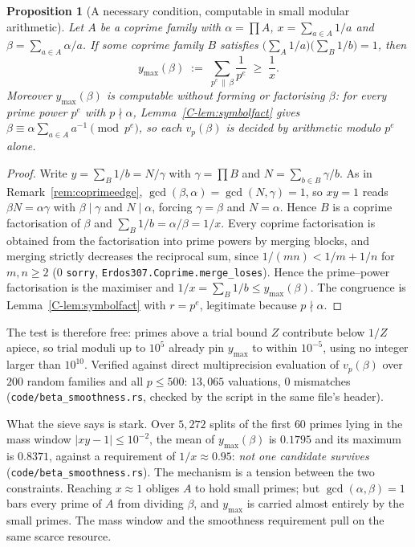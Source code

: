 \documentclass[11pt]{article}
\newtheorem{proposition}[theorem]{Proposition}
\theoremstyle{definition}
\begin{document}
\begin{proposition}[A necessary condition, computable in small modular arithmetic]\label{prop:coprimesieve}
Let $A$ be a coprime family with $\alpha=\prod A$, $x=\sum_{a\in A}1/a$ and
$\beta=\sum_{a\in A}\alpha/a$. If some coprime family $B$ satisfies $\bigl(\sum_A1/a\bigr)
\bigl(\sum_B1/b\bigr)=1$, then
\[ y_{\max}(\beta)\;:=\;\sum_{p^e\,\|\,\beta}\frac1{p^e}\;\ge\;\frac1x .\]
Moreover $y_{\max}(\beta)$ is computable without forming or factorising $\beta$: for every prime
power $p^e$ with $p\nmid\alpha$, Lemma~\ref{C-lem:symbolfact} gives
$\beta\equiv\alpha\sum_{a\in A}a^{-1}\pmod{p^e}$, so each $v_p(\beta)$ is decided by arithmetic
modulo $p^e$ alone.
\end{proposition}
\begin{proof}
Write $y=\sum_B1/b=N/\gamma$ with $\gamma=\prod B$ and $N=\sum_{b\in B}\gamma/b$. As in
Remark~\ref{rem:coprimeedge}, $\gcd(\beta,\alpha)=\gcd(N,\gamma)=1$, so $xy=1$ reads
$\beta N=\alpha\gamma$ with $\beta\mid\gamma$ and $N\mid\alpha$, forcing $\gamma=\beta$ and
$N=\alpha$. Hence $B$ is a coprime factorisation of $\beta$ and $\sum_B1/b=\alpha/\beta=1/x$. Every coprime factorisation is obtained
from the factorisation into prime powers by merging blocks, and merging strictly decreases the
reciprocal sum, since $1/(mn)<1/m+1/n$ for $m,n\ge2$ \textup{(}$0$ \texttt{sorry},
\texttt{Erdos307.Coprime.merge\_loses}\textup{)}. Hence the prime--power factorisation is the
maximiser and $1/x=\sum_B1/b\le y_{\max}(\beta)$. The congruence is
Lemma~\ref{C-lem:symbolfact} with $r=p^e$, legitimate because $p\nmid\alpha$.
\end{proof}

The test is therefore free: primes above a trial bound $Z$ contribute below $1/Z$ apiece, so trial
moduli up to $10^5$ already pin $y_{\max}$ to within $10^{-5}$, using no integer larger than $10^{10}$.
Verified against direct multiprecision evaluation of $v_p(\beta)$ over $200$ random families and all
$p\le500$: $13{,}065$ valuations, $0$ mismatches \textup{(\texttt{code/beta\_smoothness.rs},
checked by the script in the same file's header)}.

What the sieve says is stark. Over $5{,}272$ splits of the first $60$ primes lying in the mass window
$|xy-1|\le10^{-2}$, the mean of $y_{\max}(\beta)$ is $0.1795$ and its maximum is $0.8371$, against a
requirement of $1/x\approx0.95$: \emph{not one candidate survives}
\textup{(\texttt{code/beta\_smoothness.rs})}. The mechanism is a tension between the two constraints.
Reaching $x\approx1$ obliges $A$ to hold small primes; but $\gcd(\alpha,\beta)=1$ bars every prime of
$A$ from dividing $\beta$, and $y_{\max}$ is carried almost entirely by the small primes. The mass
window and the smoothness requirement pull on the same scarce resource.
\end{document}
